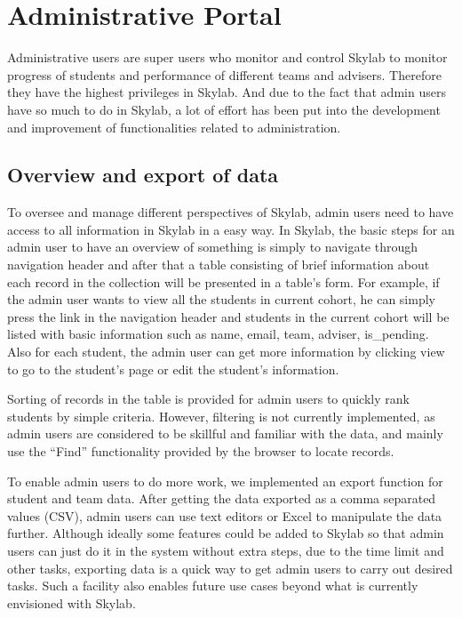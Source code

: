 \chapter{Administrative Portal} \label{adminportal}

Administrative users are super users who monitor and control Skylab to monitor progress of students and performance of different teams and advisers. Therefore they have the highest privileges in Skylab. And due to the fact that admin users have so much to do in Skylab, a lot of effort has been put into the development and improvement of functionalities related to administration.

\section{Overview and export of data} \label{adminoverview}

To oversee and manage different perspectives of Skylab, admin users need to have access to all information in Skylab in a easy way. In Skylab, the basic steps for an admin user to have an overview of something is simply to navigate through navigation header and after that a table consisting of brief information about each record in the collection will be presented in a table's form. For example, if the admin user wants to view all the students in current cohort, he can simply press the link in the navigation header and students in the current cohort will be listed with basic information such as name, email, team, adviser, is\_pending. Also for each student, the admin user can get more information by clicking view to go to the student's page or edit the student's information.

Sorting of records in the table is provided for admin users to quickly rank students by simple criteria. However, filtering is not currently implemented, as admin users are considered to be skillful and familiar with the data, and mainly use the ``Find'' functionality provided by the browser to locate records.

To enable admin users to do more work, we implemented an export function for student and team data. After getting the data exported as a comma separated values (CSV), admin users can use text editors or Excel to manipulate the data further. Although ideally some features could be added to Skylab so that admin users can just do it in the system without extra steps, due to the time limit and other tasks, exporting data is a quick way to get admin users to carry out desired tasks.  Such a facility also enables future use cases beyond what is currently envisioned with Skylab.

